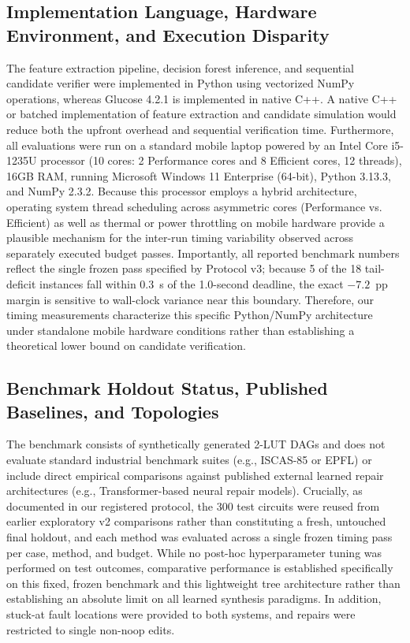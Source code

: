 \documentclass[11pt]{article}
\begin{document}
\subsection{Implementation Language, Hardware Environment, and Execution Disparity}
The feature extraction pipeline, decision forest inference, and sequential candidate verifier were implemented in Python using vectorized NumPy operations, whereas Glucose 4.2.1 is implemented in native C++. A native C++ or batched implementation of feature extraction and candidate simulation would reduce both the upfront overhead and sequential verification time. Furthermore, all evaluations were run on a standard mobile laptop powered by an Intel Core i5-1235U processor (10 cores: 2 Performance cores and 8 Efficient cores, 12 threads), 16GB RAM, running Microsoft Windows 11 Enterprise (64-bit), Python 3.13.3, and NumPy 2.3.2. Because this processor employs a hybrid architecture, operating system thread scheduling across asymmetric cores (Performance vs. Efficient) as well as thermal or power throttling on mobile hardware provide a plausible mechanism for the inter-run timing variability observed across separately executed budget passes. Importantly, all reported benchmark numbers reflect the single frozen pass specified by Protocol v3; because 5 of the 18 tail-deficit instances fall within 0.3~s of the 1.0-second deadline, the exact $-7.2$~pp margin is sensitive to wall-clock variance near this boundary. Therefore, our timing measurements characterize this specific Python/NumPy architecture under standalone mobile hardware conditions rather than establishing a theoretical lower bound on candidate verification.

\subsection{Benchmark Holdout Status, Published Baselines, and Topologies}
The benchmark consists of synthetically generated 2-LUT DAGs and does not evaluate standard industrial benchmark suites (e.g., ISCAS-85 or EPFL) or include direct empirical comparisons against published external learned repair architectures (e.g., Transformer-based neural repair models). Crucially, as documented in our registered protocol, the 300 test circuits were reused from earlier exploratory v2 comparisons rather than constituting a fresh, untouched final holdout, and each method was evaluated across a single frozen timing pass per case, method, and budget. While no post-hoc hyperparameter tuning was performed on test outcomes, comparative performance is established specifically on this fixed, frozen benchmark and this lightweight tree architecture rather than establishing an absolute limit on all learned synthesis paradigms. In addition, stuck-at fault locations were provided to both systems, and repairs were restricted to single non-noop edits.
\end{document}
